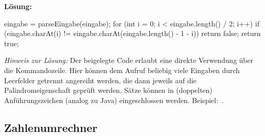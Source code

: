 \documentclass[table]{sopra-base}
\makeatletter
\newenvironment{solution}{\null\par\noindent\textbf{\textcolor{sob@col@uulm@cs}{Lösung:}}\newline\bgroup\color{black}\slshape\ignorespaces}{\egroup}
\makeatother
\begin{document}
\begin{solution}
\begin{java}[firstnumber=34]
{    eingabe = parseEingabe(eingabe);
    for (int i = 0; i < eingabe.length() / 2; i++) {
        if (eingabe.charAt(i) != eingabe.charAt(eingabe.length() - 1 - i))
            return false;
    }
    return true;
}
\end{java}
    \textit{Hinweis zur Lösung:} Der beigelegte Code erlaubt eine direkte Verwendung über die Kommandozeile. Hier können dem Aufruf  beliebig viele Eingaben durch Leerfelder getrennt angereiht werden, die dann jeweils auf die Palindromeigenschaft geprüft werden. Sätze können in (doppelten) Anführungszeichen (analog zu Java) eingeschlossen werden. Beispiel:
    \,.
\end{solution}

\subsection{Zahlenumrechner}
\end{document}
